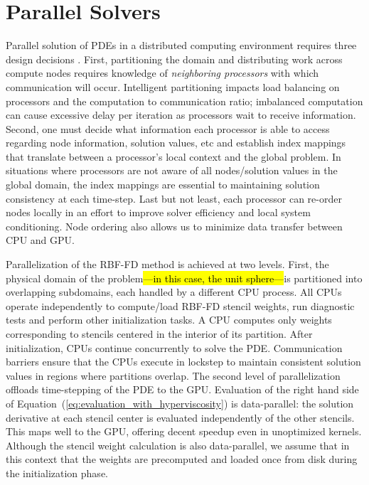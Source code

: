 \documentclass{report}
\begin{document}
\fi

\chapter{Parallel Solvers}
\label{sec:rbffd_gpu}

Parallel solution of PDEs in a distributed computing environment requires three
design decisions \cite{Saad2003}. First, partitioning the domain and
distributing work across compute nodes requires knowledge of \emph{neighboring processors} with which communication will occur. Intelligent partitioning
impacts load balancing on processors and the computation to communication
ratio; imbalanced computation can cause excessive delay per
iteration as processors wait to receive information. Second, one must decide
what information each processor is able to access regarding node information,
solution values, etc and establish index mappings that translate between a
processor's local context and the global problem. In situations where
processors are not aware of all nodes/solution values in the global domain, the
index mappings are essential to maintaining solution consistency at each
time-step. Last but not least, each processor can re-order nodes locally in an
effort to improve solver efficiency and local system conditioning. Node
ordering also allows us to minimize data transfer between CPU and GPU. 


Parallelization of the RBF-FD method is achieved at two levels. First, the
physical domain of the problem\hl{---in this case, the unit sphere---}is partitioned
into overlapping subdomains, each handled by a different CPU process. All CPUs
operate independently to compute/load RBF-FD stencil weights, run diagnostic
tests and perform other initialization tasks. A CPU computes only weights
corresponding to stencils centered in the interior of its partition. After
initialization, CPUs continue concurrently to solve the PDE. Communication
barriers ensure that the CPUs execute in lockstep to maintain consistent
solution values in regions where partitions overlap.  The second level of
parallelization offloads time-stepping of the PDE to the GPU.  Evaluation of
the right hand side of Equation~(\ref{eq:evaluation_with_hyperviscosity}) is
data-parallel: the solution derivative at each stencil center is evaluated
independently of the other stencils. This maps well to the GPU, offering decent
speedup even in unoptimized kernels. Although the stencil weight calculation is
also data-parallel, we assume that in this context that the weights are
precomputed and loaded once from disk during the initialization phase. 
\end{document}
